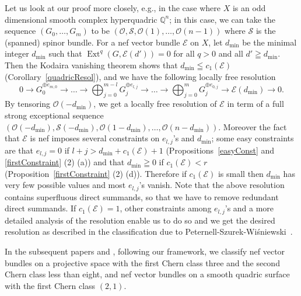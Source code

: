 \documentclass[a4paper,12pt]{amsart}
\DeclareMathOperator{\Ext}{Ext}
\begin{document}
Let us look at our proof more closely, e.g., in the case where 
$X$ is an odd dimensional smooth complex hyperquadric 
$\mathbb{Q}^n$;
in this case, we can take the sequence $(G_0,\dots,G_m)$ 
to be
$(\mathcal{O},\mathcal{S},\mathcal{O}(1), \dots,\mathcal{O}(n-1))$
where $\mathcal{S}$ is the (spanned) spinor bundle.
For a nef vector bundle $\mathcal{E}$ on $X$, 
let $d_{\min}$ be the minimal integer $d_{\min}$ such that $\Ext^q(G,\mathcal{E}(d'))=0$ for all $q>0$ and all $d'\geqq d_{\min}$.
Then the Kodaira vanishing theorem shows that $d_{\min}\leqq c_1(\mathcal{E})$
(Corollary~\ref{quadricResol}),
and we have the following 
locally free resolution
\[0\to G_0^{\oplus e_{m,0}}\to\dots\to \bigoplus_{j=0}^{m-l}G_{j}^{\oplus e_{l,j}}\to\dots\to
\bigoplus_{j=0}^{m}G_{j}^{\oplus e_{0,j}}\to \mathcal{E}(d_{\min})
\to 0.\]
By tensoring $\mathcal{O}(-d_{\min})$,
we get a locally free resolution of $\mathcal{E}$
in term of a full strong exceptional sequence 
$(\mathcal{O}(-d_{\min}),\mathcal{S}(-d_{\min}),\mathcal{O}(1-d_{\min}), \dots,\mathcal{O}(n-d_{\min}))$.
Moreover the fact that $\mathcal{E}$ is nef imposes several constraints on $e_{l,j}$'s and $d_{\min}$;
some easy constraints are that $e_{l,j}=0$ if 
$l+j>d_{\min}+c_1(\mathcal{E})+1$ (Propositions~\ref{easyConst} and \ref{firstConstraint} (2) (a))
and that $d_{\min}\geqq 0$ if 
$c_1(\mathcal{E})<r$ (Proposition~\ref{firstConstraint} (2) (d)).
Therefore if 
$c_1(\mathcal{E})$
is small then 
$d_{\min}$ has very few possible values
 and most $e_{l,j}$'s vanish.
Note that the above resolution 
contains superfluous direct summands,
so that we have to remove redundant direct summands.
If 
$c_1(\mathcal{E})=1$, other constraints among $e_{l,j}$'s and a more detailed analysis of the resolution
enable us to do so and we get the desired 
resolution as described in the classification due to Peternell-Szurek-Wi\'{s}niewski~\cite{pswnef}.

In
the subsequent papers \cite{Nefofc1=3OnPN} and \cite{Nefofc1=(21)OnQ2},
following our framework,
we classify nef vector bundles on a projective space with the first Chern class three
and the second Chern class less than eight,
and nef vector bundles on a smooth quadric surface with the first Chern class $(2,1)$.
\end{document}
